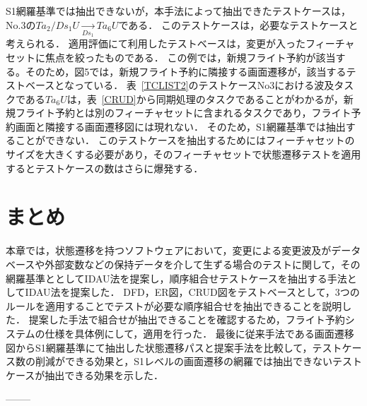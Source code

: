 S1網羅基準では抽出できないが，本手法によって抽出できたテストケースは，No.3の$Ta_2/Ds_1U  \xrightarrow[Ds_1]{} Ta_6U$である．
このテストケースは，必要なテストケースと考えられる．
適用評価にて利用したテストベースは，変更が入ったフィーチャセットに焦点を絞ったものである．
この例では，新規フライト予約が該当する。そのため，図5では，新規フライト予約に隣接する画面遷移が，該当するテストベースとなっている．
表~\ref{TCLIST2}のテストケースNo3における波及タスクである$Ta_6U$は，表~\ref{CRUD}から同期処理のタスクであることがわかるが，新規フライト予約とは別のフィーチャセットに含まれるタスクであり，フライト予約画面と隣接する画面遷移図には現れない．
そのため，S1網羅基準では抽出することができない．
このテストケースを抽出するためにはフィーチャセットのサイズを大きくする必要があり，そのフィーチャセットで状態遷移テストを適用するとテストケースの数はさらに爆発する．

\section{まとめ}
本章では，状態遷移を持つソフトウェアにおいて，変更による変更波及がデータベースや外部変数などの保持データを介して生ずる場合のテストに関して，その網羅基準ととしてIDAU法を提案し，順序組合せテストケースを抽出する手法としてIDAU法を提案した．
DFD，ER図，CRUD図をテストベースとして，3つのルールを適用することでテストが必要な順序組合せを抽出できることを説明した．
提案した手法で組合せが抽出できることを確認するため，フライト予約システムの仕様を具体例にして，適用を行った．
最後に従来手法である画面遷移図からS1網羅基準にて抽出した状態遷移パスと提案手法を比較して，テストケース数の削減ができる効果と，S1レベルの画面遷移の網羅では抽出できないテストケースが抽出できる効果を示した．



--------
